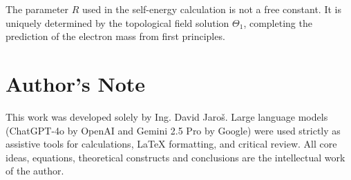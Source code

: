 \documentclass[11pt]{article}
\begin{document}
The parameter \( R \) used in the self-energy calculation is not a free constant. It is uniquely determined by the topological field solution \(\Theta_1\), completing the prediction of the electron mass from first principles.


\section*{Author's Note}

This work was developed solely by Ing. David Jaroš.  
Large language models (ChatGPT-4o by OpenAI and Gemini 2.5 Pro by Google) were used strictly as assistive tools for calculations, LaTeX formatting, and critical review.  
All core ideas, equations, theoretical constructs and conclusions are the intellectual work of the author.
\end{document}
